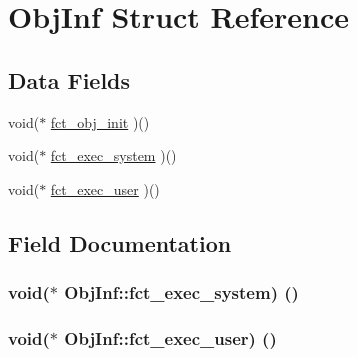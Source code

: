 \hypertarget{structObjInf}{}\section{Obj\+Inf Struct Reference}
\label{structObjInf}
\subsection*{Data Fields}
\begin{DoxyCompactItemize}
\item 
void($\ast$ \hyperlink{structObjInf_a87ba4456d48d1ca4b94a0d0e7f44650c}{fct\+\_\+obj\+\_\+init} )()
\item 
void($\ast$ \hyperlink{structObjInf_a5b3f237a232e4cfae91c10bfe78f163f}{fct\+\_\+exec\+\_\+system} )()
\item 
void($\ast$ \hyperlink{structObjInf_a394489a76d14d4711797e459a15ebfb4}{fct\+\_\+exec\+\_\+user} )()
\end{DoxyCompactItemize}


\subsection{Field Documentation}
\subsubsection[{\texorpdfstring{fct\+\_\+exec\+\_\+system}{fct_exec_system}}]{\setlength{\rightskip}{0pt plus 5cm}void($\ast$ Obj\+Inf\+::fct\+\_\+exec\+\_\+system) ()}\hypertarget{structObjInf_a5b3f237a232e4cfae91c10bfe78f163f}{}\label{structObjInf_a5b3f237a232e4cfae91c10bfe78f163f}
\subsubsection[{\texorpdfstring{fct\+\_\+exec\+\_\+user}{fct_exec_user}}]{\setlength{\rightskip}{0pt plus 5cm}void($\ast$ Obj\+Inf\+::fct\+\_\+exec\+\_\+user) ()}\hypertarget{structObjInf_a394489a76d14d4711797e459a15ebfb4}{}\label{structObjInf_a394489a76d14d4711797e459a15ebfb4}
